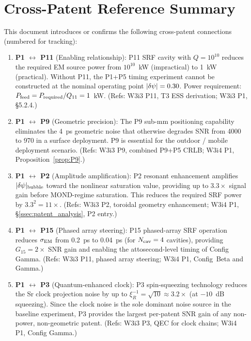 \section{Cross-Patent Reference Summary}
\label{sec:cross_refs}

This document introduces or confirms the following cross-patent connections
(numbered for tracking):

\begin{enumerate}[label=\textbf{CR-\arabic*.}, leftmargin=*, itemsep=4pt]

\item \textbf{P1 $\leftrightarrow$ P11} (Enabling relationship):
P11 SRF cavity with $Q = 10^{10}$ reduces the required EM source power
from $10^{10}$~kW (impractical) to 1~kW (practical). Without P11, the
P1+P5 timing experiment cannot be constructed at the nominal operating
point $|\delta\psi| = 0.30$. Power requirement: $P_{\rm feed} = P_{\rm required}/Q_{11}
= 1$~kW. (Refs: W3i3 P11, T3 ESS derivation; W3i3 P1, \S5.2.4.)

\item \textbf{P1 $\leftrightarrow$ P9} (Geometric precision):
The P9 sub-mm positioning capability eliminates the 4~ps geometric
noise that otherwise degrades SNR from 4000 to 970 in a surface
deployment. P9 is essential for the outdoor / mobile deployment scenario.
(Refs: W3i3 P9, combined P9+P5 CRLB; W3i4 P1, Proposition~\ref{prop:P9}.)

\item \textbf{P1 $\leftrightarrow$ P2} (Amplitude amplification):
P2 resonant enhancement amplifies $|\delta\psi|_{\rm bubble}$ toward the
nonlinear saturation value, providing up to $3.3\times$ signal gain
before MOND-regime saturation. This reduces the required SRF power
by $3.3^2 = 11\times$. (Refs: W3i3 P2, toroidal geometry enhancement;
W3i4 P1, \S\ref{ssec:patent_analysis}, P2 entry.)

\item \textbf{P1 $\leftrightarrow$ P15} (Phased array steering):
P15 phased-array SRF operation reduces $\sigma_{\rm EM}$ from 0.2~ps to
0.04~ps (for $N_{\rm cav} = 4$ cavities), providing $G_{15} = 2\times$
SNR gain and enabling the attosecond-level timing of Config Gamma.
(Refs: W3i3 P11, phased array steering; W3i4 P1, Config~Beta and Gamma.)

\item \textbf{P1 $\leftrightarrow$ P3} (Quantum-enhanced clock):
P3 spin-squeezing technology reduces the Sr clock projection noise by
up to $\xi_R^{-1} = \sqrt{10} \approx 3.2\times$ (at $-10$~dB squeezing).
Since the clock noise is the sole dominant noise source in the baseline
experiment, P3 provides the largest per-patent SNR gain of any non-power,
non-geometric patent. (Refs: W3i3 P3, QEC for clock chains; W3i4 P1,
Config Gamma.)


\end{enumerate}
